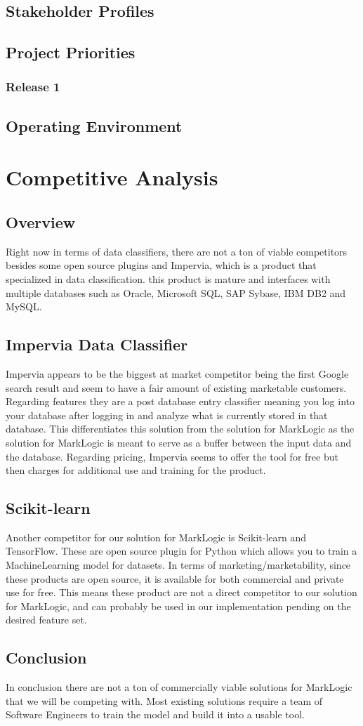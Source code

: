 \documentclass[12pt,oneside,letterpaper]{article}
\begin{document}
\subsection{Stakeholder Profiles}
\subsection{Project Priorities}
\subsubsection{Release 1}
\subsection{Operating Environment}

\section{Competitive Analysis}
\subsection{Overview}
Right now in terms of data classifiers, there are not a ton of viable competitors besides some open source plugins and Impervia, which is a product that specialized in data classification. this product is mature and interfaces with multiple databases such as Oracle, Microsoft SQL, SAP Sybase, IBM DB2 and MySQL.  \subsection{Impervia Data Classifier}
Impervia appears to be the biggest at market competitor being the first Google search result and seem to have a fair amount of existing marketable customers. Regarding features they are a post database entry classifier meaning you log into your database after logging in and analyze what is currently stored in that database. This differentiates this solution from the solution for MarkLogic as the solution for MarkLogic is meant to serve as a buffer between the input data and the database.  Regarding pricing, Impervia seems to offer the tool for free but then charges for additional use and training for the product. 


\subsection{Scikit-learn}
Another competitor for our solution for MarkLogic is Scikit-learn and TensorFlow. These are open source plugin for Python which allows you to train a MachineLearning model for datasets. In terms of marketing/marketability, since these products are open source, it is available for both commercial and private use for free. This means these product are not a direct competitor to our solution for MarkLogic, and can probably be used in our implementation pending on the desired feature set. 

\subsection{Conclusion}
In conclusion there are not a ton of commercially viable solutions for MarkLogic that we will be competing with. Most existing solutions require a team of Software Engineers to train the model and build it into a usable tool. 
\end{document}
